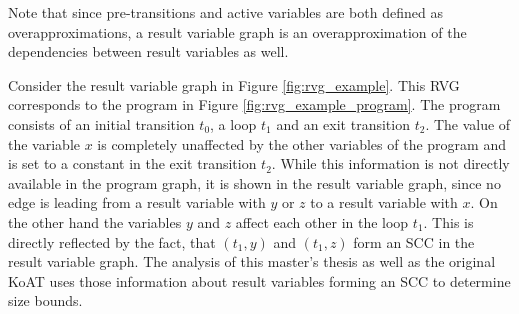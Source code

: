 Note that since pre-transitions and active variables are both defined as overapproximations, a result variable graph is an overapproximation of the dependencies between result variables as well.



Consider the result variable graph in Figure \ref{fig:rvg_example}.
This RVG corresponds to the program in Figure \ref{fig:rvg_example_program}.
The program consists of an initial transition $t_0$, a loop $t_1$ and an exit transition $t_2$.
The value of the variable $x$ is completely unaffected by the other variables of the program and is set to a constant in the exit transition $t_2$.
While this information is not directly available in the program graph, it is shown in the result variable graph, since no edge is leading from a result variable with $y$ or $z$ to a result variable with $x$.
On the other hand the variables $y$ and $z$ affect each other in the loop $t_1$.
This is directly reflected by the fact, that $(t_1,y)$ and $(t_1,z)$ form an SCC in the result variable graph.
The analysis of this master's thesis as well as the original KoAT \cite{koat} uses those information about result variables forming an SCC to determine size bounds.
